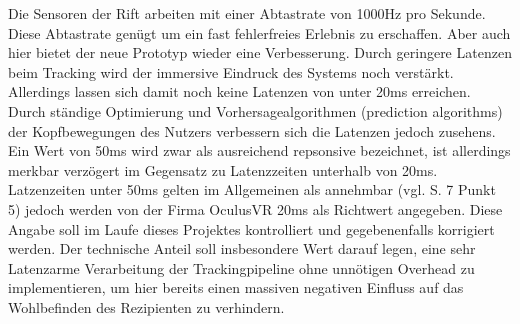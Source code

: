 \documentclass[pagesize, paper=a4, fontsize=12pt,titlepage=true, headings=small, headnosepline, abstractoff, liststotoc, nochapterprefix, plainheadsepline]{scrreprt}
\begin{document}
Die Sensoren der Rift arbeiten mit einer Abtastrate von 1000Hz pro Sekunde. Diese Abtastrate genügt um ein fast fehlerfreies Erlebnis zu erschaffen. Aber auch hier bietet der neue Prototyp wieder eine Verbesserung. Durch geringere Latenzen beim Tracking wird der immersive Eindruck des Systems noch verstärkt. Allerdings lassen sich damit noch keine Latenzen von unter 20ms erreichen. Durch ständige Optimierung und Vorhersagealgorithmen (prediction algorithms) der Kopfbewegungen des Nutzers verbessern sich die Latenzen jedoch zusehens. Ein Wert von 50ms wird zwar als ausreichend repsonsive bezeichnet, ist allerdings merkbar verzögert im Gegensatz zu  Latenzzeiten unterhalb von 20ms. Latzenzeiten unter 50ms gelten im Allgemeinen als annehmbar (vgl. \cite{MeRazWhitBro2003} S. 7 Punkt 5) jedoch werden von der Firma OculusVR 20ms als Richtwert angegeben. Diese Angabe soll im Laufe dieses Projektes kontrolliert und gegebenenfalls korrigiert werden. Der technische Anteil soll insbesondere Wert darauf legen, eine sehr Latenzarme Verarbeitung der Trackingpipeline ohne unnötigen Overhead zu implementieren, um hier bereits einen massiven negativen Einfluss auf das Wohlbefinden des Rezipienten zu verhindern.
\end{document}
